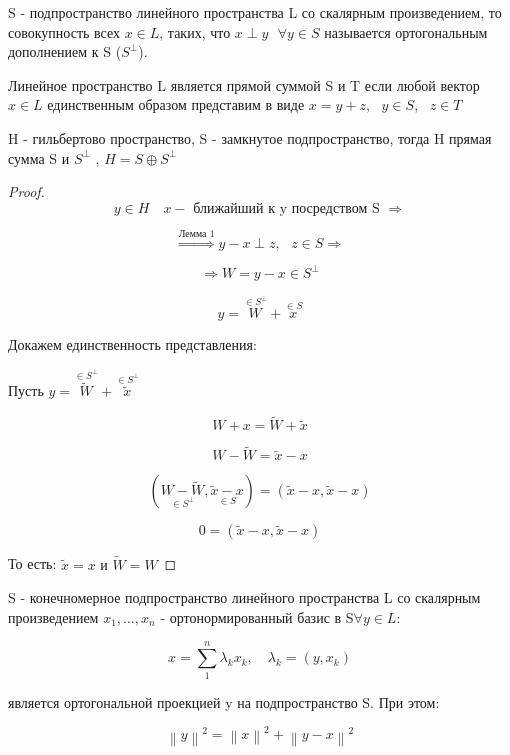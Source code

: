 \documentclass[12pt, a4paper]{report}
\begin{document}
\begin{definition}
    S - подпространство линейного пространства L  со скалярным произведением, то совокупность всех \( x \in  L    \), таких, что \( x \perp y \text{ }  \forall  y \in S  \) называется ортогональным дополнением к S  (\( S^{\perp }  \)).
\end{definition}

\begin{definition}
    Линейное пространство L является прямой суммой S  и T если любой вектор \( x \in  L      \)  единственным образом представим в виде \( x = y + z , \text{ }  y \in  S , \text{  } z \in  T  \) 
\end{definition}

\begin{lemma}
    H - гильбертово пространство, S - замкнутое подпространство, тогда H  прямая сумма S  и \(  S^{\perp } \) , \( H =   S \oplus S^{\perp }   \) 
\end{lemma}

\begin{proof}
    
    \[  y \in  H \quad  x - \text{ ближайший к y посредством S } \Rightarrow  \] 

    \[ \overset{\text{Лемма 1} }{\Rightarrow} y -x \perp  z , \text{ }  z \in  S \Rightarrow  \] 

    \[\Rightarrow  W = y -x \in  S^{\perp }  \]  

    \[ y = \overset{ \in  S ^{\perp } }{W} +\overset{\in  S }{ x}  \] 

    Докажем единственность представления: 

    Пусть \( y = \overset{ \in  S ^{\perp } }{\tilde{W }} + \overset{ \in  S ^{\perp } }{\tilde{ x }}  \) 

    \[  W + x = \tilde{ W } +\tilde{ x } \] 

    \[ W - \tilde{W } = \tilde{ x } - x  \] 

    \[ (\underset{\in  S ^{\perp }}{W- \tilde{W }}  , \underset{\in S}{ \tilde{ x } - x }) = (\tilde{x } -x , \tilde{x } - x ) \] 

    \[ 0 =  (\tilde{x } -x , \tilde{x } - x )\] 

    То есть: \( \tilde{x } = x  \text{ и }  \tilde{W } = W  \) 
\end{proof}

\begin{theorem}
    S - конечномерное подпространство линейного пространства L со скалярным произведением \( x_1, \ldots, x_n    \)  - ортонормированный базис в S\( \forall  y \in  L     \):

    \[ x = \sum_{1} ^n \lambda_k x_k , \quad  \lambda_k = (y , x_k) \] 

    является ортогональной проекцией y на подпространство S. При этом: 

    \[  \left\lVert  y  \right\rVert ^2 =\left\lVert  x  \right\rVert ^2 + \left\lVert  y -x   \right\rVert ^2  \] 
\end{theorem}
\end{document}
